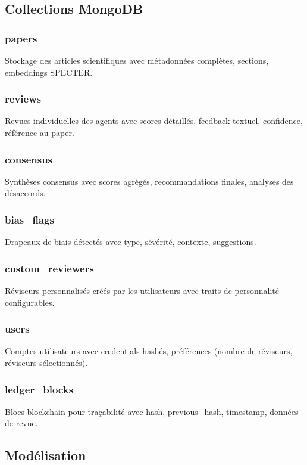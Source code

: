 \documentclass[12pt,a4paper]{article}
\begin{document}
\subsection{Collections MongoDB}

\subsubsection{papers}
Stockage des articles scientifiques avec métadonnées complètes, sections, embeddings SPECTER.

\subsubsection{reviews}
Revues individuelles des agents avec scores détaillés, feedback textuel, confidence, référence au paper.

\subsubsection{consensus}
Synthèses consensus avec scores agrégés, recommandations finales, analyses des désaccords.

\subsubsection{bias\_flags}
Drapeaux de biais détectés avec type, sévérité, contexte, suggestions.

\subsubsection{custom\_reviewers}
Réviseurs personnalisés créés par les utilisateurs avec traits de personnalité configurables.

\subsubsection{users}
Comptes utilisateurs avec credentials hashés, préférences (nombre de réviseurs, réviseurs sélectionnés).

\subsubsection{ledger\_blocks}
Blocs blockchain pour traçabilité avec hash, previous\_hash, timestamp, données de revue.

\subsection{Modélisation}
\end{document}
